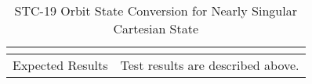 \begin{table}[htbp!]
\begin{tabular}{|p{1.05 in} |p{4.75 in} |}
\begin{compactenum}
         \end{compactenum}
         \\ \hline
         Expected Results & Test results are described above.\\
      \hline
      \end{tabular}
      \label{Table:STC-19}
      \caption{STC-19 Orbit State Conversion for Nearly Singular Cartesian State}
\end{table}

